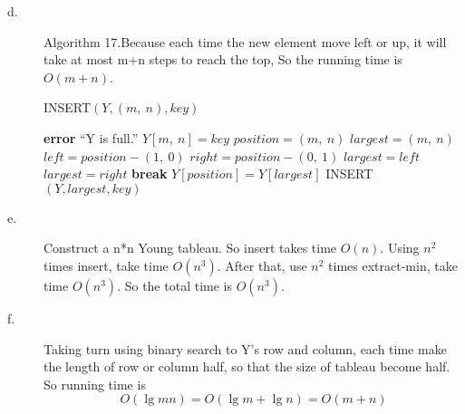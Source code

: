 \documentclass[10pt]{article}
\begin{document}
\begin{description}
\item[d. ] Algorithm 17.Because each time the new element move left or up, it will take at most m+n steps to reach the top, So the running time is $O(m+n)$.
  \begin{algorithm}
    \caption{INSERT$(Y, (m,\ n), key)$}
    \begin{algorithmic}[1]
      \STATE \textbf{error} ``Y is full.''
      \ENDIF
      \STATE $Y[m,\ n] = key$
      \STATE $position = (m,\ n)$
      \STATE $largest = (m,\ n)$
      \STATE $left = position - (1,\ 0)$
      \STATE $right = position - (0,\ 1)$
      \STATE $largest = left$
      \ENDIF
      \STATE $largest = right$
      \ENDIF
      \STATE \textbf{break}
      \ELSE
      \STATE $Y[position] = Y[largest]$
      \STATE INSERT$(Y, largest, key)$
      \ENDIF
      \ENDWHILE
    \end{algorithmic}
  \end{algorithm}

\item[e. ] Construct a n*n Young tableau. So insert takes time $O(n)$. Using $n^2$ times insert, take time $O(n^3)$. After that, use $n^2$ times extract-min, take time $O(n^3)$.  So the total time is $O(n^3)$.

\item[f. ]   Taking turn using binary search to Y's row and column, each time make the length of row or column half, so that the size of tableau become half. So running time is
\[O(\lg mn) = O(\lg m + \lg n) = O(m+n)\]

\end{description}
\end{document}
